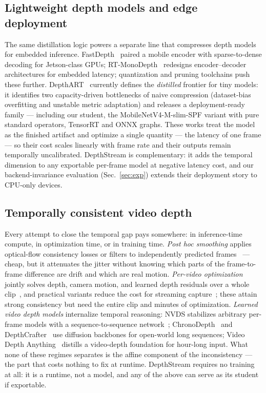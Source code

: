 \documentclass[10pt,twocolumn]{article}
\begin{document}
\subsection{Lightweight depth models and edge deployment}
The same distillation logic powers a separate line that compresses depth
models for embedded inference.
FastDepth~\cite{fastdepth} paired a mobile encoder with sparse-to-dense
decoding for Jetson-class GPUs; RT-MonoDepth~\cite{rtmonodepth} redesigns
encoder--decoder architectures for embedded latency; quantization and
pruning toolchains push these further. DepthART~\cite{depthart} currently
defines the \emph{distilled} frontier for tiny models: it identifies two
capacity-driven bottlenecks of naive compression (dataset-bias overfitting
and unstable metric adaptation) and releases a deployment-ready family ---
including our student, the MobileNetV4-M-slim-SPF variant with pure
standard operators, TensorRT and ONNX graphs. These works treat the model
as the finished artifact and optimize a single quantity --- the latency of
one frame --- so their cost scales linearly with frame rate and their
outputs remain temporally uncalibrated. DepthStream is complementary: it
adds the temporal dimension to any exportable per-frame model at negative
latency cost, and our backend-invariance evaluation
(Sec.~\ref{sec:exp}) extends their deployment story to CPU-only devices.

\subsection{Temporally consistent video depth}
Every attempt to close the temporal gap pays somewhere: in inference-time
compute, in optimization time, or in training time. \emph{Post hoc
smoothing} applies optical-flow consistency losses or filters to
independently predicted frames~\cite{teccvideodepth} --- cheap, but it
attenuates the jitter without knowing which parts of the frame-to-frame
difference are drift and which are real motion. \emph{Per-video
optimization} jointly solves depth, camera motion, and learned depth
residuals over a whole clip~\cite{cvd}, and practical variants reduce the
cost for streaming capture~\cite{practicalcvd}; these attain strong
consistency but need the entire clip and minutes of optimization.
\emph{Learned video depth models} internalize temporal reasoning: NVDS
stabilizes arbitrary per-frame models with a sequence-to-sequence
network~\cite{nvds}; ChronoDepth~\cite{chronodepth} and
DepthCrafter~\cite{depthcrafter} use diffusion backbones for open-world
long sequences; Video Depth Anything~\cite{vda} distills a video-depth
foundation for hour-long input. What none of these regimes separates is the
affine component of the inconsistency --- the part that costs nothing to
fix at runtime. DepthStream requires no training at all: it is a runtime,
not a model, and any of the above can serve as its student if exportable.
\end{document}
